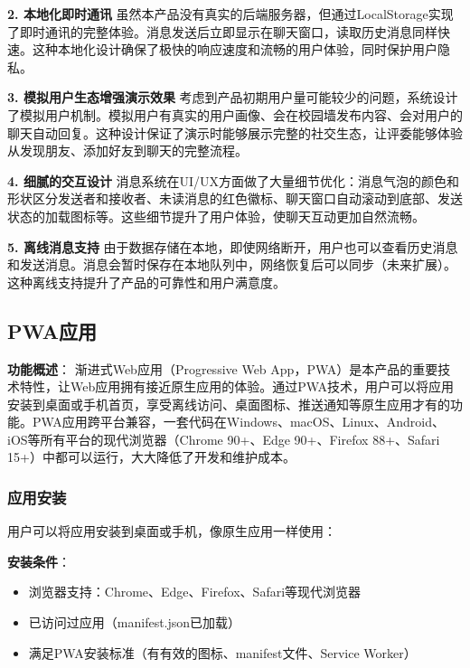 \documentclass[12pt,a4paper]{article}
\begin{document}
\textbf{2. 本地化即时通讯}
虽然本产品没有真实的后端服务器，但通过LocalStorage实现了即时通讯的完整体验。消息发送后立即显示在聊天窗口，读取历史消息同样快速。这种本地化设计确保了极快的响应速度和流畅的用户体验，同时保护用户隐私。

\textbf{3. 模拟用户生态增强演示效果}
考虑到产品初期用户量可能较少的问题，系统设计了模拟用户机制。模拟用户有真实的用户画像、会在校园墙发布内容、会对用户的聊天自动回复。这种设计保证了演示时能够展示完整的社交生态，让评委能够体验从发现朋友、添加好友到聊天的完整流程。

\textbf{4. 细腻的交互设计}
消息系统在UI/UX方面做了大量细节优化：消息气泡的颜色和形状区分发送者和接收者、未读消息的红色徽标、聊天窗口自动滚动到底部、发送状态的加载图标等。这些细节提升了用户体验，使聊天互动更加自然流畅。

\textbf{5. 离线消息支持}
由于数据存储在本地，即使网络断开，用户也可以查看历史消息和发送消息。消息会暂时保存在本地队列中，网络恢复后可以同步（未来扩展）。这种离线支持提升了产品的可靠性和用户满意度。

\subsection{PWA应用}

\textbf{功能概述}：
渐进式Web应用（Progressive Web App，PWA）是本产品的重要技术特性，让Web应用拥有接近原生应用的体验。通过PWA技术，用户可以将应用安装到桌面或手机首页，享受离线访问、桌面图标、推送通知等原生应用才有的功能。PWA应用跨平台兼容，一套代码在Windows、macOS、Linux、Android、iOS等所有平台的现代浏览器（Chrome 90+、Edge 90+、Firefox 88+、Safari 15+）中都可以运行，大大降低了开发和维护成本。

\subsubsection{应用安装}

用户可以将应用安装到桌面或手机，像原生应用一样使用：

\textbf{安装条件}：
\begin{itemize}
    \item 浏览器支持：Chrome、Edge、Firefox、Safari等现代浏览器
    \item 已访问过应用（manifest.json已加载）
    \item 满足PWA安装标准（有有效的图标、manifest文件、Service Worker）
\end{itemize}
\end{document}
